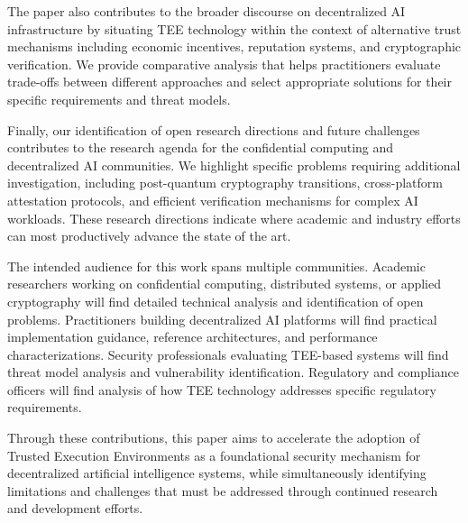 The paper also contributes to the broader discourse on decentralized AI infrastructure by situating TEE technology within the context of alternative trust mechanisms including economic incentives, reputation systems, and cryptographic verification. We provide comparative analysis that helps practitioners evaluate trade-offs between different approaches and select appropriate solutions for their specific requirements and threat models.

Finally, our identification of open research directions and future challenges contributes to the research agenda for the confidential computing and decentralized AI communities. We highlight specific problems requiring additional investigation, including post-quantum cryptography transitions, cross-platform attestation protocols, and efficient verification mechanisms for complex AI workloads. These research directions indicate where academic and industry efforts can most productively advance the state of the art.

The intended audience for this work spans multiple communities. Academic researchers working on confidential computing, distributed systems, or applied cryptography will find detailed technical analysis and identification of open problems. Practitioners building decentralized AI platforms will find practical implementation guidance, reference architectures, and performance characterizations. Security professionals evaluating TEE-based systems will find threat model analysis and vulnerability identification. Regulatory and compliance officers will find analysis of how TEE technology addresses specific regulatory requirements.

Through these contributions, this paper aims to accelerate the adoption of Trusted Execution Environments as a foundational security mechanism for decentralized artificial intelligence systems, while simultaneously identifying limitations and challenges that must be addressed through continued research and development efforts.
